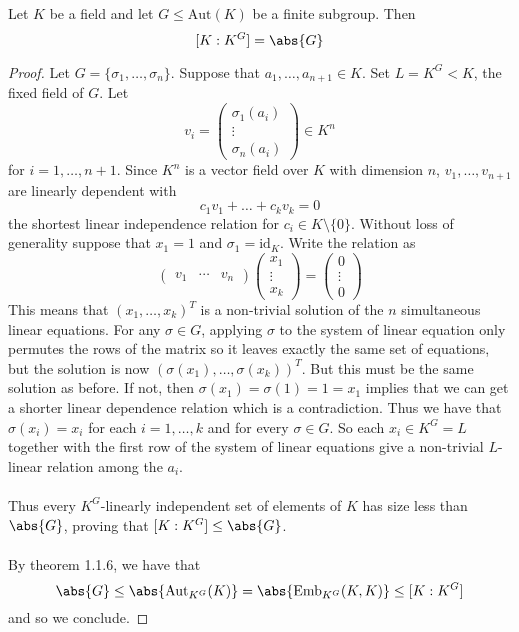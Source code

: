 \documentclass[a4paper]{article}
\begin{document}
\begin{thm}{}{} Let $K$ be a field and let $G\leq\text{Aut}(K)$ be a finite subgroup. Then $$[K:K^G]=\abs{G}$$ \tcbline
\begin{proof}
Let $G=\{\sigma_1,\dots,\sigma_n\}$. Suppose that $a_1,\dots,a_{n+1}\in K$. Set $L=K^G<K$, the fixed field of $G$. Let $$v_i=\begin{pmatrix}
\sigma_1(a_i)\\
\vdots\\
\sigma_n(a_i)
\end{pmatrix}\in K^n$$ for $i=1,\dots,n+1$. Since $K^n$ is a vector field over $K$ with dimension $n$, $v_1,\dots,v_{n+1}$ are linearly dependent with $$c_1v_1+\dots+c_kv_k=0$$ the shortest linear independence relation for $c_i\in K\setminus\{0\}$. Without loss of generality suppose that $x_1=1$ and $\sigma_1=\text{id}_K$. Write the relation as $$\begin{pmatrix}
v_1 & \cdots & v_n
\end{pmatrix}\begin{pmatrix}
x_1\\\vdots\\x_k
\end{pmatrix}=\begin{pmatrix}
0\\
\vdots\\
0
\end{pmatrix}$$ This means that $(x_1,\dots,x_k)^T$ is a non-trivial solution of the $n$ simultaneous linear equations. For any $\sigma\in G$, applying $\sigma$ to the system of linear equation only permutes the rows of the matrix so it leaves exactly the same set of equations, but the solution is now $(\sigma(x_1),\dots,\sigma(x_k))^T$. But this must be the same solution as before. If not, then $\sigma(x_1)=\sigma(1)=1=x_1$ implies that we can get a shorter linear dependence relation which is a contradiction. Thus we have that $\sigma(x_i)=x_i$ for each $i=1,\dots,k$ and for every $\sigma\in G$. So each $x_i\in K^G=L$ together with the first row of the system of linear equations give a non-trivial $L$-linear relation among the $a_i$. \\~\\

Thus every $K^G$-linearly independent set of elements of $K$ has size less than $\abs{G}$, proving that $[K:K^G]\leq\abs{G}$. \\~\\

By theorem 1.1.6, we have that $$\abs{G}\leq\abs{\text{Aut}_{K^G}(K)}=\abs{\text{Emb}_{K^G}(K,K)}\leq[K:K^G]$$ and so we conclude. 
\end{proof}
\end{thm}
\end{document}
